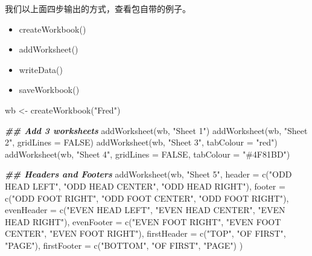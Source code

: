 \documentclass[
]{book}
\newenvironment{Shaded}{\begin{snugshade}}{\end{snugshade}}
\newcommand{\AttributeTok}[1]{\textcolor[rgb]{0.77,0.63,0.00}{#1}}
\newcommand{\ConstantTok}[1]{\textcolor[rgb]{0.00,0.00,0.00}{#1}}
\newcommand{\DocumentationTok}[1]{\textcolor[rgb]{0.56,0.35,0.01}{\textbf{\textit{#1}}}}
\newcommand{\FunctionTok}[1]{\textcolor[rgb]{0.00,0.00,0.00}{#1}}
\newcommand{\NormalTok}[1]{#1}
\newcommand{\OtherTok}[1]{\textcolor[rgb]{0.56,0.35,0.01}{#1}}
\newcommand{\StringTok}[1]{\textcolor[rgb]{0.31,0.60,0.02}{#1}}
\begin{document}
我们以上面四步输出的方式，查看包自带的例子。

\begin{itemize}
\item
  createWorkbook()
\item
  addWorksheet()
\item
  writeData()
\item
  saveWorkbook()
\end{itemize}

\begin{Shaded}
\begin{Highlighting}[]
\NormalTok{wb }\OtherTok{\textless{}{-}} \FunctionTok{createWorkbook}\NormalTok{(}\StringTok{"Fred"}\NormalTok{)}

\DocumentationTok{\#\# Add 3 worksheets}
\FunctionTok{addWorksheet}\NormalTok{(wb, }\StringTok{"Sheet 1"}\NormalTok{)}
\FunctionTok{addWorksheet}\NormalTok{(wb, }\StringTok{"Sheet 2"}\NormalTok{, }\AttributeTok{gridLines =} \ConstantTok{FALSE}\NormalTok{)}
\FunctionTok{addWorksheet}\NormalTok{(wb, }\StringTok{"Sheet 3"}\NormalTok{, }\AttributeTok{tabColour =} \StringTok{"red"}\NormalTok{)}
\FunctionTok{addWorksheet}\NormalTok{(wb, }\StringTok{"Sheet 4"}\NormalTok{, }\AttributeTok{gridLines =} \ConstantTok{FALSE}\NormalTok{, }\AttributeTok{tabColour =} \StringTok{"\#4F81BD"}\NormalTok{)}

\DocumentationTok{\#\# Headers and Footers}
\FunctionTok{addWorksheet}\NormalTok{(wb, }\StringTok{"Sheet 5"}\NormalTok{,}
  \AttributeTok{header =} \FunctionTok{c}\NormalTok{(}\StringTok{"ODD HEAD LEFT"}\NormalTok{, }\StringTok{"ODD HEAD CENTER"}\NormalTok{, }\StringTok{"ODD HEAD RIGHT"}\NormalTok{),}
  \AttributeTok{footer =} \FunctionTok{c}\NormalTok{(}\StringTok{"ODD FOOT RIGHT"}\NormalTok{, }\StringTok{"ODD FOOT CENTER"}\NormalTok{, }\StringTok{"ODD FOOT RIGHT"}\NormalTok{),}
  \AttributeTok{evenHeader =} \FunctionTok{c}\NormalTok{(}\StringTok{"EVEN HEAD LEFT"}\NormalTok{, }\StringTok{"EVEN HEAD CENTER"}\NormalTok{, }\StringTok{"EVEN HEAD RIGHT"}\NormalTok{),}
  \AttributeTok{evenFooter =} \FunctionTok{c}\NormalTok{(}\StringTok{"EVEN FOOT RIGHT"}\NormalTok{, }\StringTok{"EVEN FOOT CENTER"}\NormalTok{, }\StringTok{"EVEN FOOT RIGHT"}\NormalTok{),}
  \AttributeTok{firstHeader =} \FunctionTok{c}\NormalTok{(}\StringTok{"TOP"}\NormalTok{, }\StringTok{"OF FIRST"}\NormalTok{, }\StringTok{"PAGE"}\NormalTok{),}
  \AttributeTok{firstFooter =} \FunctionTok{c}\NormalTok{(}\StringTok{"BOTTOM"}\NormalTok{, }\StringTok{"OF FIRST"}\NormalTok{, }\StringTok{"PAGE"}\NormalTok{)}
\NormalTok{)}


\end{Highlighting}
\end{Shaded}
\end{document}

